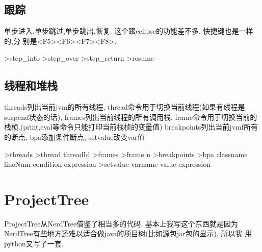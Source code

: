 \documentclass[oneside,openany]{book}
\begin{document}
  \subsection{跟踪}

    单步进入,单步跳过,单步跳出,恢复. 这个跟eclipse的功能差不多. 快捷键也是一样的,分
    别是<F5><F6><F7><F8>.
    \begin{mdframed}[style=SmallFrame]
      \begin{flushleft}
      >step\_into\newline
      >step\_over\newline
      >step\_return\newline
      >resume           
      \end{flushleft}
    \end{mdframed}

    

  \subsection{线程和堆栈}
  threads列出当前jvm的所有线程, thread命令用于切换当前线程(如果有线程是suspend状态的话),
  frames列出当前线程的所有调用栈. frame命令用于切换当前的栈桢.(print,eval等命令只能打印当前栈桢的变量值)
  breakpoints列出当前jvmf所有的断点, bpa添加条件断点, setvalue改变var值
    \begin{mdframed}[style=SmallFrame]
      \begin{flushleft}
      >threads\newline
      >thread threadId\newline
      >frames\newline
      >frame n\newline
      >breakpoints\newline
      >bpa classname lineNum condition-expression\newline
      >setvalue  varname value-expression\newline
      \end{flushleft}
    \end{mdframed}


\section{ProjectTree}

  ProjectTree从NerdTree借鉴了相当多的代码, 基本上我写这个东西就是因为
NerdTree有些地方还难以适合做java的项目树(比如源包jar包的显示), 所以我
用python又写了一套.
\end{document}
